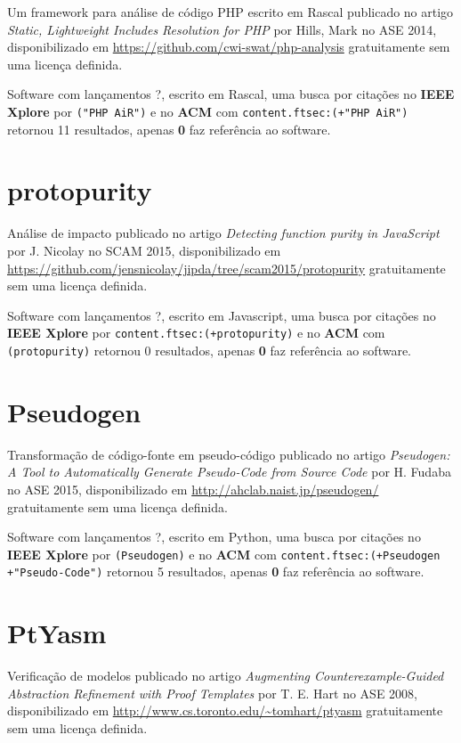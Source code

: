 Um framework para análise de código PHP escrito em Rascal
publicado no artigo {\it Static, Lightweight Includes Resolution for PHP}
por Hills, Mark
no ASE 2014,
disponibilizado em \url{https://github.com/cwi-swat/php-analysis}
gratuitamente
sem uma licença definida.

Software com lançamentos ?,
escrito em Rascal,
uma busca por citações no {\bf IEEE Xplore} por
\texttt{("PHP AiR")}
e no {\bf ACM} com
\texttt{content.ftsec:(+"PHP AiR")}
retornou
11 resultados, apenas
{\bf 0} faz referência ao software.



\section{protopurity}

Análise de impacto
publicado no artigo {\it Detecting function purity in JavaScript}
por J. Nicolay
no SCAM 2015,
disponibilizado em \url{https://github.com/jensnicolay/jipda/tree/scam2015/protopurity}
gratuitamente
sem uma licença definida.

Software com lançamentos ?,
escrito em Javascript,
uma busca por citações no {\bf IEEE Xplore} por
\texttt{content.ftsec:(+protopurity)}
e no {\bf ACM} com
\texttt{(protopurity)}
retornou
0 resultados, apenas
{\bf 0} faz referência ao software.



\section{Pseudogen}

Transformação de código-fonte em pseudo-código
publicado no artigo {\it Pseudogen: A Tool to Automatically Generate Pseudo-Code from Source Code}
por H. Fudaba
no ASE 2015,
disponibilizado em \url{http://ahclab.naist.jp/pseudogen/}
gratuitamente
sem uma licença definida.

Software com lançamentos ?,
escrito em Python,
uma busca por citações no {\bf IEEE Xplore} por
\texttt{(Pseudogen)}
e no {\bf ACM} com
\texttt{content.ftsec:(+Pseudogen +"Pseudo-Code")}
retornou
5 resultados, apenas
{\bf 0} faz referência ao software.



\section{PtYasm}

Verificação de modelos
publicado no artigo {\it Augmenting Counterexample-Guided Abstraction Refinement with Proof Templates}
por T. E. Hart
no ASE 2008,
disponibilizado em \url{http://www.cs.toronto.edu/~tomhart/ptyasm}
gratuitamente
sem uma licença definida.

